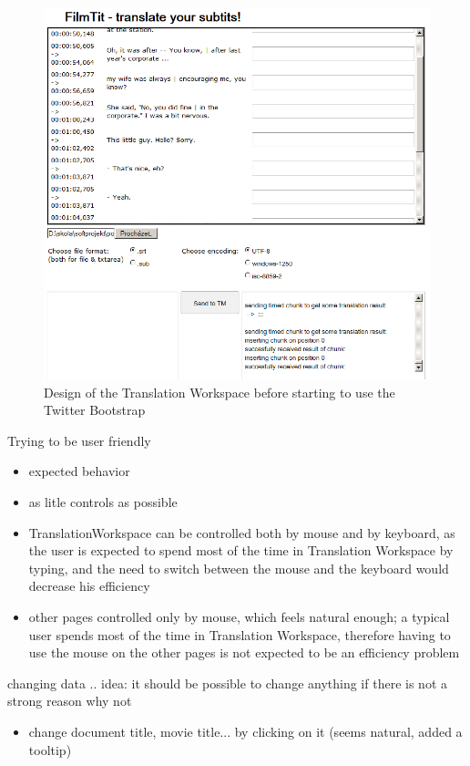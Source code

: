 {\begin{figure}
\begin{center}
\includegraphics[scale=0.5]{figures/old_screenshot.png}
\end{center}
\caption{Design of the Translation Workspace before starting to use the Twitter Bootstrap}
\label{fig:before_bootstrap}
\end{figure}

Trying to be user friendly

\begin{itemize}
\item expected behavior
\item as litle controls as possible
\item TranslationWorkspace can be controlled both by mouse and by keyboard, as the user is expected to spend most of the time in Translation Workspace by typing, and the need to switch between the mouse and the keyboard would decrease his efficiency
\item other pages controlled only by mouse, which feels natural enough; a typical user spends most of the time in Translation Workspace, therefore having to use the mouse on the other pages is not expected to be an efficiency problem
\end{itemize}

changing data .. idea: it should be possible to change anything if there is not a strong reason why not
\begin{itemize}
\item change document title, movie title... by clicking on it (seems natural, added a tooltip)


\end{itemize}}
